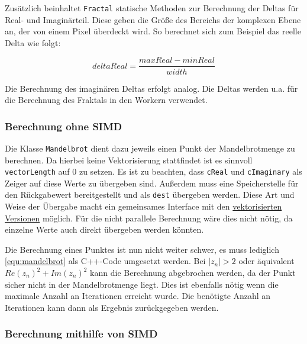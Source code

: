 \begin{figure}
	
\end{figure}

Zusätzlich beinhaltet \verb|Fractal| statische Methoden zur Berechnung der Deltas für Real- und Imaginärteil.
Diese geben die Größe des Bereichs der komplexen Ebene an, der von einem Pixel überdeckt wird.
So berechnet sich zum Beispiel das reelle Delta wie folgt:

\begin{equation*}
	deltaReal = \frac{maxReal - minReal}{width}
\end{equation*}

Die Berechnung des imaginären Deltas erfolgt analog.
Die Deltas werden u.a. für die Berechnung des Fraktals in den Workern verwendet.

\subsubsection{Berechnung ohne SIMD}

Die Klasse \verb|Mandelbrot| dient dazu jeweils einen Punkt der Mandelbrotmenge zu berechnen.
Da hierbei keine Vektorisierung stattfindet ist es sinnvoll \verb|vectorLength| auf 0 zu setzen.
Es ist zu beachten, dass \verb|cReal| und \verb|cImaginary| als Zeiger auf diese Werte zu übergeben sind.
Außerdem muss eine Speicherstelle für den Rückgabewert bereitgestellt und als \verb|dest| übergeben werden.
Diese Art und Weise der Übergabe macht ein gemeinsames Interface mit den \hyperref[subsec:simd]{vektorisierten Versionen} möglich.
Für die nicht parallele Berechnung wäre dies nicht nötig, da einzelne Werte auch direkt übergeben werden könnten.

Die Berechnung eines Punktes ist nun nicht weiter schwer, es muss lediglich \autoref{equ:mandelbrot} als C++-Code umgesetzt werden.
Bei $|z_n| > 2$ oder äquivalent $Re(z_n)^2 + Im(z_n)^2$ kann die Berechnung abgebrochen werden, da der Punkt sicher nicht in der Mandelbrotmenge liegt.
Dies ist ebenfalls nötig wenn die maximale Anzahl an Iterationen erreicht wurde.
Die benötigte Anzahl an Iterationen kann dann als Ergebnis zurückgegeben werden.

\subsubsection{Berechnung mithilfe von SIMD}\label{subsec:simd}

